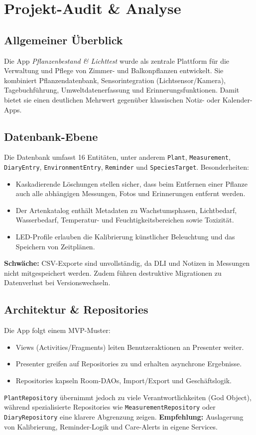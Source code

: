 \documentclass[14pt,a4paper]{report}
\begin{document}
\chapter{Projekt-Audit \& Analyse}

\section{Allgemeiner Überblick}
Die App \textit{Pflanzenbestand \& Lichttest} wurde als zentrale Plattform für die Verwaltung und Pflege von Zimmer- und Balkonpflanzen entwickelt. 
Sie kombiniert Pflanzendatenbank, Sensorintegration (Lichtsensor/Kamera), Tagebuchführung, Umweltdatenerfassung und Erinnerungsfunktionen. 
Damit bietet sie einen deutlichen Mehrwert gegenüber klassischen Notiz- oder Kalender-Apps.

\section{Datenbank-Ebene}
Die Datenbank umfasst 16 Entitäten, unter anderem \texttt{Plant}, \texttt{Measurement}, \texttt{DiaryEntry}, \texttt{EnvironmentEntry}, \texttt{Reminder} und \texttt{SpeciesTarget}. 
Besonderheiten:
\begin{itemize}
    \item Kaskadierende Löschungen stellen sicher, dass beim Entfernen einer Pflanze auch alle abhängigen Messungen, Fotos und Erinnerungen entfernt werden.
    \item Der Artenkatalog enthält Metadaten zu Wachstumsphasen, Lichtbedarf, Wasserbedarf, Temperatur- und Feuchtigkeitsbereichen sowie Toxizität.
    \item LED-Profile erlauben die Kalibrierung künstlicher Beleuchtung und das Speichern von Zeitplänen.
\end{itemize}
\textbf{Schwäche:} CSV-Exporte sind unvollständig, da DLI und Notizen in Messungen nicht mitgespeichert werden. Zudem führen destruktive Migrationen zu Datenverlust bei Versionswechseln.

\section{Architektur \& Repositories}
Die App folgt einem MVP-Muster: 
\begin{itemize}
    \item Views (Activities/Fragments) leiten Benutzeraktionen an Presenter weiter.
    \item Presenter greifen auf Repositories zu und erhalten asynchrone Ergebnisse.
    \item Repositories kapseln Room-DAOs, Import/Export und Geschäftslogik.
\end{itemize}
\texttt{PlantRepository} übernimmt jedoch zu viele Verantwortlichkeiten (God Object), während spezialisierte Repositories wie \texttt{MeasurementRepository} oder \texttt{DiaryRepository} eine klarere Abgrenzung zeigen.  
\textbf{Empfehlung:} Auslagerung von Kalibrierung, Reminder-Logik und Care-Alerts in eigene Services.
\end{document}
